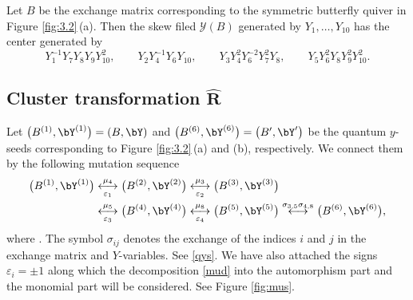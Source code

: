 \begin{Remark}\label{re:c1}
 Let $B$ be the exchange matrix corresponding to the symmetric
 butterfly quiver in Figure \ref{fig:3.2}\,(a). Then the skew filed
 $\mathcal{Y}(B)$ generated by $Y_1, \dots, Y_{10}$ has the center
 generated by
\[
Y^{-1}_1Y_7Y_8Y_9Y^2_{10},\qquad
Y_2Y^{-1}_4Y_6Y_{10},\qquad
Y_3Y^2_4Y^{-2}_6Y^2_7Y_8,\qquad
Y_5Y^2_6Y_8Y^2_9Y^2_{10}.
\]


\end{Remark}

\subsection[Cluster transformation R]{Cluster transformation $\boldsymbol{\widehat{R}}$}

Let $\bigl(B^{(1)}, \bY^{(1)}\bigr) = (B, \bY)$ and
$\bigl(B^{(6)}, \bY^{(6)}\bigr) = \bigl(B', \bY'\bigr)$ be the quantum $y$-seeds corresponding to Figure \ref{fig:3.2}\,(a) and (b), respectively.
We connect them by the following mutation sequence
%
\begin{align}
\bigl(B^{(1)}, \bY^{(1)}\bigr) &\underset{\varepsilon_1}{\overset{\mu_4}{\longleftrightarrow}}
\bigl(B^{(2)}, \bY^{(2)}\bigr) \underset{\varepsilon_2}{\overset{\mu_3}{\longleftrightarrow}}
\bigl(B^{(3)}, \bY^{(3)}\bigr)\nonumber
\\
&\underset{\varepsilon_3}{\overset{\mu_5}{\longleftrightarrow}}
\bigl(B^{(4)}, \bY^{(4)}\bigr) \underset{\varepsilon_4}{\overset{\mu_8}{\longleftrightarrow}}
\bigl(B^{(5)}, \bY^{(5)}\bigr) \overset{\sigma_{3,5}\sigma_{4,8}}{\longleftrightarrow}
\bigl(B^{(6)}, \bY^{(6)}\bigr),\label{mus}
\end{align}
where . The symbol
$\sigma_{ij}$ denotes the exchange of the indices $i$ and $j$ in the
exchange matrix and $Y$-variables. See \eqref{qys}. We have also
attached the signs $\varepsilon_i=\pm 1$ along which the decomposition
\eqref{mud} into the automorphism part and the monomial part will be
considered. See Figure \ref{fig:mus}.

